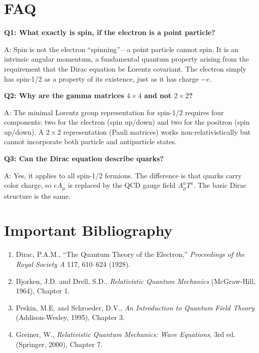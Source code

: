 \documentclass[11pt,openright]{book}
\begin{document}
\section*{FAQ}

\textbf{Q1: What exactly is spin, if the electron is a point particle?}

A: Spin is not the electron ``spinning''---a point particle cannot spin. It is an intrinsic angular momentum, a fundamental quantum property arising from the requirement that the Dirac equation be Lorentz covariant. The electron simply has spin-1/2 as a property of its existence, just as it has charge $-e$.

\textbf{Q2: Why are the gamma matrices $4\times 4$ and not $2\times 2$?}

A: The minimal Lorentz group representation for spin-1/2 requires four components: two for the electron (spin up/down) and two for the positron (spin up/down). A $2\times 2$ representation (Pauli matrices) works non-relativistically but cannot incorporate both particle and antiparticle states.

\textbf{Q3: Can the Dirac equation describe quarks?}

A: Yes, it applies to all spin-1/2 fermions. The difference is that quarks carry color charge, so $eA_\mu$ is replaced by the QCD gauge field $A_\mu^a T^a$. The basic Dirac structure is the same.
\section*{Important Bibliography}

\begin{enumerate}
\item Dirac, P.A.M., ``The Quantum Theory of the Electron,'' \textit{Proceedings of the Royal Society A} 117, 610--624 (1928).
\item Bjorken, J.D. and Drell, S.D., \textit{Relativistic Quantum Mechanics} (McGraw-Hill, 1964), Chapter 1.
\item Peskin, M.E. and Schroeder, D.V., \textit{An Introduction to Quantum Field Theory} (Addison-Wesley, 1995), Chapter 3.
\item Greiner, W., \textit{Relativistic Quantum Mechanics: Wave Equations}, 3rd ed. (Springer, 2000), Chapter 7.
\end{enumerate}
\end{document}
